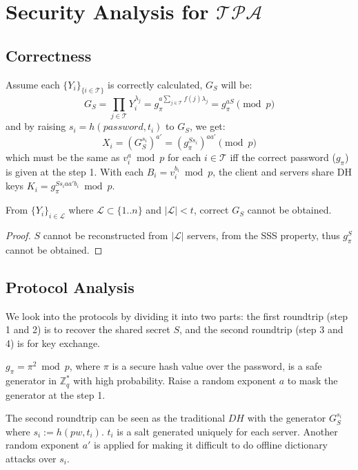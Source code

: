 \section{Security Analysis for $\mathcal{TPA}$}
\label{tpa}
\subsection{Correctness}
Assume each $\{Y_i\}_{\{i \in \mathcal{T}\}}$ is correctly calculated,
$G_S$ will be:
\[
  G_S = \prod_{j \in \mathcal{T}}Y_i^{\lambda_j} = g_{\pi}^{a \sum_{j
      \in \mathcal{T}} f(j) \lambda_j} = g_{\pi}^{aS} \pmod p
\]
and by raising $s_i = h(password, t_i)$ to $G_S$, we get:
\[
  X_i = (G_S^{s_i})^{a'} = (g_{\pi}^{Ss_i})^{aa'} \pmod p
\]
which must be the same as $v_i^{a} \bmod p$ for each $i \in
\mathcal{T}$ iff the correct password ($g_{\pi}$) is given at the
step 1. With each $B_i = v_i^{b_i} \bmod p$, the client and servers
share DH keys $K_i = g_{\pi}^{Ss_iaa'b_i} \bmod p$.

\begin{lemma}
\label{tpa1}
From $\{Y_i\}_{i \in \mathcal{L}}$ where $\mathcal{L} \subset \{1..n\}$ and $|\mathcal{L}| <
t$, correct $G_S$ cannot be obtained.
\end{lemma}

\begin{proof}
$S$ cannot be reconstructed from $|\mathcal{L}|$ servers, from the SSS
  property, thus $g_{\pi}^S$ cannot be obtained.
\end{proof}

\subsection{Protocol Analysis}
We look into the protocols by dividing it into two parts: the first
roundtrip (step 1 and 2) is to recover the shared secret $S$, and
the second roundtrip (step 3 and 4) is for key exchange.

$g_{\pi} = \pi^2 \bmod p$, where $\pi$ is a secure hash value over the
password, is a safe generator in $\mathbb{Z}^*_q$ with high
probability. Raise a random exponent $a$ to mask the generator at the
step 1. 

The second roundtrip can be seen as the traditional $DH$ with the
generator $G_S^{s_i}$ where $s_i := h(pw, t_i)$. $t_i$ is a salt
generated uniquely for each server. Another random exponent $a'$ is
applied for making it difficult to do offline dictionary attacks over
$s_i$.

